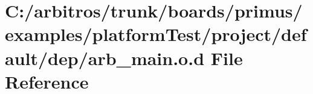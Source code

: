 \hypertarget{platform_test_2project_2default_2dep_2arb__main_8o_8d}{\section{C\-:/arbitros/trunk/boards/primus/examples/platform\-Test/project/default/dep/arb\-\_\-main.o.\-d File Reference}
\label{platform_test_2project_2default_2dep_2arb__main_8o_8d}
}
